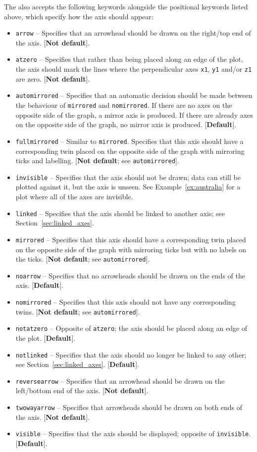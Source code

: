 The  also accepts the following keywords alongside the
positional keywords listed above, which specify how the axis should appear:
\begin{itemize}
\item {\tt arrow} -- Specifies that an arrowhead should be drawn on the right/top end of the axis. [{\bf Not default}].
\item {\tt atzero} -- Specifies that rather than being placed along an edge of the plot, the axis should mark the lines where the perpendicular axes {\tt x1}, {\tt y1} and/or {\tt z1} are zero. [{\bf Not default}].
\item {\tt automirrored} -- Specifies that an automatic decision should be made between the behaviour of {\tt mirrored} and {\tt nomirrored}. If there are no axes on the opposite side of the graph, a mirror axis is produced. If there are already axes on the opposite side of the graph, no mirror axis is produced. [{\bf Default}].
\item {\tt fullmirrored} -- Similar to {\tt mirrored}. Specifies that this axis should have a corresponding twin placed on the opposite side of the graph with mirroring ticks and labelling. [{\bf Not default}; see {\tt automirrored}].
\item {\tt invisible} -- Specifies that the axis should not be drawn; data can still be plotted against it, but the axis is unseen. See Example~\ref{ex:australia} for a plot where all of the axes are invisible.
\item {\tt linked} -- Specifies that the axis should be linked to another axis; see Section~\ref{sec:linked_axes}.
\item {\tt mirrored} -- Specifies that this axis should have a corresponding twin placed on the opposite side of the graph with mirroring ticks but with no labels on the ticks. [{\bf Not default}; see {\tt automirrored}].
\item {\tt noarrow} -- Specifies that no arrowheads should be drawn on the ends of the axis. [{\bf Default}].
\item {\tt nomirrored} -- Specifies that this axis should not have any corresponding twins. [{\bf Not default}; see {\tt automirrored}].
\item {\tt notatzero} -- Opposite of {\tt atzero}; the axis should be placed along an edge of the plot. [{\bf Default}].
\item {\tt notlinked} -- Specifies that the axis should no longer be linked to any other; see Section~\ref{sec:linked_axes}. [{\bf Default}].
\item {\tt reversearrow} -- Specifies that an arrowhead should be drawn on the left/bottom end of the axis. [{\bf Not default}].
\item {\tt twowayarrow} -- Specifies that arrowheads should be drawn on both ends of the axis. [{\bf Not default}].
\item {\tt visible} -- Specifies that the axis should be displayed; opposite of {\tt invisible}. [{\bf Default}].
\end{itemize}

